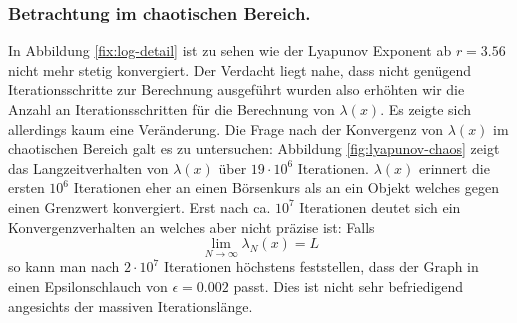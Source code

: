 \documentclass[12pt,a4paper]{article}
\begin{document}
\subsubsection{Betrachtung im chaotischen Bereich.}
In Abbildung \ref{fix:log-detail} ist zu sehen wie der Lyapunov Exponent ab $r=3.56$ nicht mehr stetig konvergiert. 
Der Verdacht liegt nahe, dass nicht genügend Iterationsschritte zur Berechnung ausgeführt wurden also erhöhten wir die Anzahl an Iterationsschritten für die Berechnung von $\lambda(x)$. Es zeigte sich allerdings kaum eine Veränderung. Die Frage nach der Konvergenz von $\lambda(x)$ im chaotischen Bereich galt es zu untersuchen: Abbildung \ref{fig:lyapunov-chaos} zeigt das Langzeitverhalten von $\lambda(x)$ über $19\cdot10^6$ Iterationen. $\lambda(x)$ erinnert die ersten $10^6$ Iterationen eher an einen Börsenkurs als an ein Objekt welches gegen einen Grenzwert konvergiert. Erst nach ca. $10^7$ Iterationen deutet sich ein Konvergenzverhalten an welches aber nicht präzise ist: Falls 
\begin{equation}
\lim_{N \rightarrow \infty} \lambda_N(x) = L
\end{equation}
so kann man nach $2\cdot10^7$ Iterationen höchstens feststellen, dass der Graph in einen Epsilonschlauch von $\epsilon=0.002$ passt. Dies ist nicht sehr befriedigend angesichts der massiven Iterationslänge.
\end{document}
